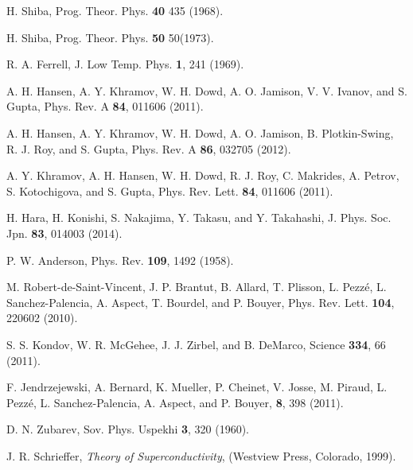 \documentclass[12pt]{jsbook}
\begin{document}
\begin{thebibliography}{9}
H. Shiba, Prog. Theor. Phys. {\bf 40} 435 (1968).

H. Shiba, Prog. Theor. Phys. {\bf 50} 50(1973).

R. A. Ferrell, J. Low Temp. Phys. {\bf 1}, 241 (1969).

A. H. Hansen, A. Y. Khramov, W. H. Dowd, A. O. Jamison, V. V. Ivanov, and S. Gupta, Phys. Rev. A {\bf 84}, 011606 (2011).

A. H. Hansen, A. Y. Khramov, W. H. Dowd, A. O. Jamison, B. Plotkin-Swing, R. J. Roy, and S. Gupta, Phys. Rev. A {\bf 86}, 032705 (2012).

A. Y. Khramov, A. H. Hansen, W. H. Dowd, R. J. Roy, C. Makrides, A. Petrov, S. Kotochigova, and S. Gupta, Phys. Rev. Lett. {\bf 84}, 011606 (2011).

H. Hara, H. Konishi, S. Nakajima, Y. Takasu, and Y. Takahashi, J. Phys. Soc. Jpn. {\bf83}, 014003 (2014).

P. W. Anderson, Phys. Rev. {\bf 109}, 1492 (1958).

M. Robert-de-Saint-Vincent, J. P. Brantut, B. Allard, T. Plisson, L. Pezz\'e, L. Sanchez-Palencia, A. Aspect, T. Bourdel, and P. Bouyer, Phys. Rev. Lett. {\bf 104}, 220602 (2010).

S. S. Kondov, W. R. McGehee, J. J. Zirbel, and B. DeMarco, Science {\bf 334}, 66 (2011).

F. Jendrzejewski, A. Bernard, K. Mueller, P. Cheinet, V. Josse, M. Piraud, L. Pezz\'e, L. Sanchez-Palencia, A. Aspect, and P. Bouyer, {\bf 8}, 398 (2011).

D. N. Zubarev, Sov. Phys. Uspekhi {\bf 3}, 320 (1960).

J. R. Schrieffer, {\it Theory of Superconductivity}, (Westview Press, Colorado, 1999).

\end{thebibliography}
\end{document}
